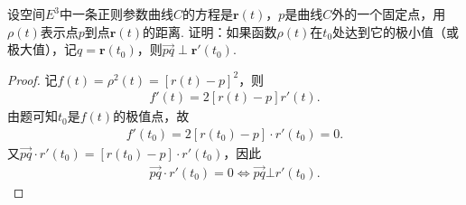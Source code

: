\documentclass[../../main.tex]{subfiles}%
\begin{document}
\begin{example}
设空间$E^3$中一条正则参数曲线$C$的方程是$\bm{r}(t)$，$p$是曲线$C$外的一个固定点，用$\rho(t)$表示点$p$到点$\bm{r}(t)$的距离. 证明：如果函数$\rho(t)$在$t_0$处达到它的极小值（或极大值），记$q = \bm{r}(t_0)$，则$\overrightarrow{pq} \perp \bm{r}'(t_0)$.
\end{example}
\begin{proof}

记$f(t)=\rho^2(t)=\left[r(t)-p\right]^2$，则
\begin{align*}
f'(t)=2\left[r(t)-p\right]r'(t).
\end{align*}
由题可知$t_0$是$f(t)$的极值点，故
\begin{align*}
f'(t_0)=2\left[r(t_0)-p\right]\cdot r'(t_0)=0.
\end{align*}
又$\overrightarrow{pq}\cdot r'(t_0)=\left[r(t_0)-p\right]\cdot r'(t_0)$，因此
\begin{align*}
\overrightarrow{pq}\cdot r'(t_0)=0\Longleftrightarrow \overrightarrow{pq}\bot r'(t_0).
\end{align*}

\end{proof}
\end{document}

